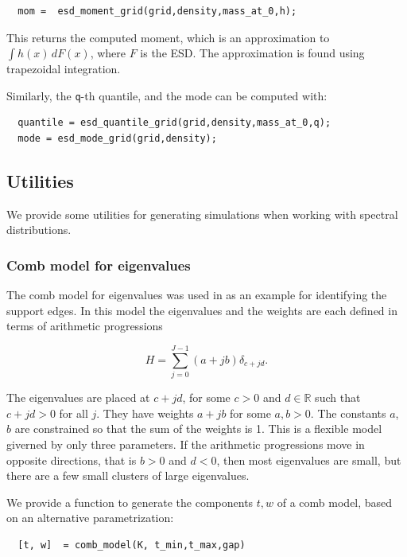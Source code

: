 \documentclass[english,11pt]{article} %
\begin{document}
\begin{verbatim}
  mom =  esd_moment_grid(grid,density,mass_at_0,h);
\end{verbatim}

This returns the computed moment, which is an approximation to $\int h(x)\, dF(x)$, where $F$ is the ESD. The approximation is found using trapezoidal integration.

Similarly, the \verb+q+-th quantile, and the mode can be computed with: 

\begin{verbatim}
  quantile = esd_quantile_grid(grid,density,mass_at_0,q);
  mode = esd_mode_grid(grid,density);
\end{verbatim}

\subsection{Utilities}

We provide some utilities for generating simulations  when working with spectral distributions. 

\subsubsection{Comb model for eigenvalues}

The comb model for eigenvalues was used in \cite{dobriban2015precise} as an example for identifying the support edges. In this model the eigenvalues and the weights are each defined in terms of arithmetic progressions

\begin{equation*}
\label{Comb_model}
H = \sum_{j=0}^{J-1} (a + jb) \delta_{c+jd}.
\end{equation*}


The eigenvalues are placed at $c+jd$, for some $c>0$ and $d \in \mathbb{R}$ such that $c+jd>0$ for all $j$. They have weights $a + jb$ for some $a,b>0$. The constants $a$, $b$ are constrained so that the sum of the weights is 1. This is a flexible model giverned by only three parameters. If the arithmetic progressions move in opposite directions, that is $b>0$ and $d<0$, then most eigenvalues are small, but there are a few small clusters of large eigenvalues.

We provide a function to generate the components $t,w$ of a comb model, based on an alternative parametrization:

\begin{verbatim}
  [t, w]  = comb_model(K, t_min,t_max,gap)
\end{verbatim}
\end{document}
